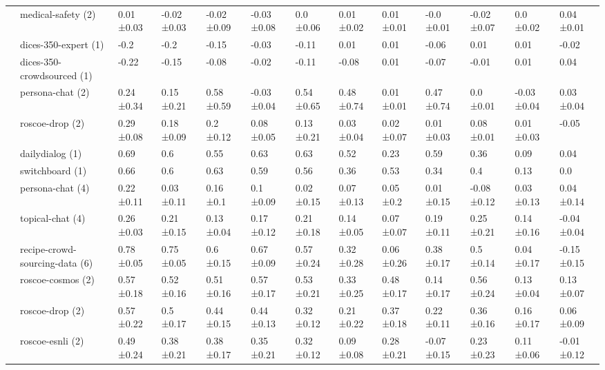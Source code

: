 \begin{tabular}{lllllllllllll}
 & \cellcolor{red!25}medical-safety (2) & 0.01 ±0.03 & -0.02 ±0.03 & -0.02 ±0.09 & -0.03 ±0.08 & 0.0 ±0.06 & 0.01 ±0.02 & 0.01 ±0.01 & -0.0 ±0.01 & -0.02 ±0.07 & 0.0 ±0.02 & 0.04 ±0.01 \\
 & \cellcolor{red!25}dices-350-expert (1) & -0.2  & -0.2  & -0.15  & -0.03  & -0.11  & 0.01  & 0.01  & -0.06  & 0.01  & 0.01  & -0.02  \\
 & \cellcolor{red!25}dices-350-crowdsourced (1) & -0.22  & -0.15  & -0.08  & -0.02  & -0.11  & -0.08  & 0.01  & -0.07  & -0.01  & 0.01  & 0.04  \\
 & \cellcolor{red!25}persona-chat (2) & 0.24 ±0.34 & 0.15 ±0.21 & 0.58 ±0.59 & -0.03 ±0.04 & 0.54 ±0.65 & 0.48 ±0.74 & 0.01 ±0.01 & 0.47 ±0.74 & 0.0 ±0.01 & -0.03 ±0.04 & 0.03 ±0.04 \\
 & \cellcolor{red!25}roscoe-drop (2) & 0.29 ±0.08 & 0.18 ±0.09 & 0.2 ±0.12 & 0.08 ±0.05 & 0.13 ±0.21 & 0.03 ±0.04 & 0.02 ±0.07 & 0.01 ±0.03 & 0.08 ±0.01 & 0.01 ±0.03 & -0.05 \\
 & \cellcolor{blue!25}dailydialog (1) & 0.69  & 0.6  & 0.55  & 0.63  & 0.63  & 0.52  & 0.23  & 0.59  & 0.36  & 0.09  & 0.04  \\
 & \cellcolor{blue!25}switchboard (1) & 0.66  & 0.6  & 0.63  & 0.59  & 0.56  & 0.36  & 0.53  & 0.34  & 0.4  & 0.13  & 0.0  \\
 & \cellcolor{red!25}persona-chat (4) & 0.22 ±0.11 & 0.03 ±0.11 & 0.16 ±0.1 & 0.1 ±0.09 & 0.02 ±0.15 & 0.07 ±0.13 & 0.05 ±0.2 & 0.01 ±0.15 & -0.08 ±0.12 & 0.03 ±0.13 & 0.04 ±0.14 \\
 & \cellcolor{red!25}topical-chat (4) & 0.26 ±0.03 & 0.21 ±0.15 & 0.13 ±0.04 & 0.17 ±0.12 & 0.21 ±0.18 & 0.14 ±0.05 & 0.07 ±0.07 & 0.19 ±0.11 & 0.25 ±0.21 & 0.14 ±0.16 & -0.04 ±0.04 \\
 & \cellcolor{red!25}recipe-crowd-sourcing-data (6) & 0.78 ±0.05 & 0.75 ±0.05 & 0.6 ±0.15 & 0.67 ±0.09 & 0.57 ±0.24 & 0.32 ±0.28 & 0.06 ±0.26 & 0.38 ±0.17 & 0.5 ±0.14 & 0.04 ±0.17 & -0.15 ±0.15 \\
 & \cellcolor{red!25}roscoe-cosmos (2) & 0.57 ±0.18 & 0.52 ±0.16 & 0.51 ±0.16 & 0.57 ±0.17 & 0.53 ±0.21 & 0.33 ±0.25 & 0.48 ±0.17 & 0.14 ±0.17 & 0.56 ±0.24 & 0.13 ±0.04 & 0.13 ±0.07 \\
 & \cellcolor{red!25}roscoe-drop (2) & 0.57 ±0.22 & 0.5 ±0.17 & 0.44 ±0.15 & 0.44 ±0.13 & 0.32 ±0.12 & 0.21 ±0.22 & 0.37 ±0.18 & 0.22 ±0.11 & 0.36 ±0.16 & 0.16 ±0.17 & 0.06 ±0.09 \\
 & \cellcolor{red!25}roscoe-esnli (2) & 0.49 ±0.24 & 0.38 ±0.21 & 0.38 ±0.17 & 0.35 ±0.21 & 0.32 ±0.12 & 0.09 ±0.08 & 0.28 ±0.21 & -0.07 ±0.15 & 0.23 ±0.23 & 0.11 ±0.06 & -0.01 ±0.12 \\

\end{tabular}
